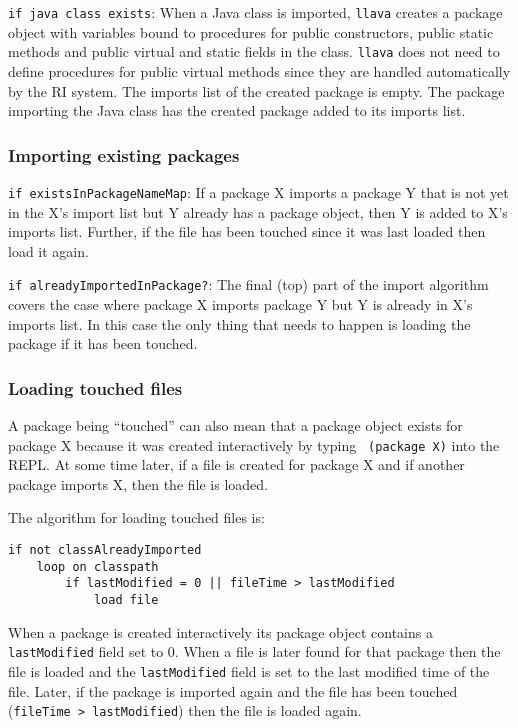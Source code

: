 \documentclass{acm-final/sig-alternate-modified}
\begin{document}
{\tt if java class exists}: When a Java class is imported, {\tt llava}
creates a package object with variables bound to procedures for public
constructors, public static methods and public virtual and static
fields in the class.  {\tt llava} does not need to define procedures
for public virtual methods since they are handled automatically by the
RI system.  The imports list of the created package is empty.  The
package importing the Java class has the created package added to its
imports list.

\subsubsection{Importing existing packages}

{\tt if existsInPackageNameMap}: If a package X imports a package Y
that is not yet in the X's import list but Y already has a package
object, then Y is added to X's imports list.  Further, if the file has
been touched since it was last loaded then load it again.

{\tt if alreadyImportedInPackage?}: The final (top) part of the import
algorithm covers the case where package X imports package Y but Y is
already in X's imports list.  In this case the only thing that needs
to happen is loading the package if it has been touched.

\subsubsection{Loading touched files}

A package being ``touched'' can also mean that a package object exists
for package X because it was created interactively by typing {\tt
(package X)} into the REPL.  At some time later, if a file is created
for package X and if another package imports X, then the file is
loaded.

The algorithm for loading touched files is:

\small
\begin{verbatim}
if not classAlreadyImported
    loop on classpath
        if lastModified = 0 || fileTime > lastModified
            load file
\end{verbatim}
\normalsize

When a package is created interactively its package object contains a
{\tt lastModified} field set to 0.  When a file is later found for
that package then the file is loaded and the {\tt lastModified} field
is set to the last modified time of the file.  Later, if the package
is imported again and the file has been touched ({\tt fileTime >
lastModified}) then the file is loaded again.
\end{document}
